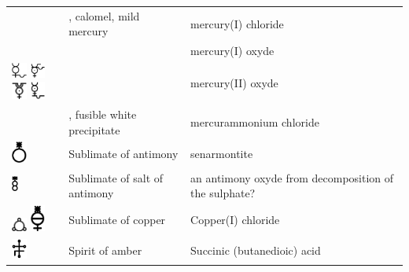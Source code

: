 \documentclass[british,final,landscape]{scrartcl}
\begin{document}
\begin{refsection}
\begin{supertabular}{p{0.3\textwidth}p{0.34\textwidth}p{0.34\textwidth}}
   & , calomel, mild mercury & mercury(I) chloride \\
   &  & mercury(I) oxyde  \\
   \includegraphics[width=5mm]{Compounds/HgO} \includegraphics[width=5mm]{Compounds/HgO2} \includegraphics[width=5mm]{Compounds/HgO3} \includegraphics[width=5mm]{Compounds/HgO4} &  & mercury(II) oxyde  \\
   & , fusible white precipitate & mercurammonium chloride  \\
   \includegraphics[width=5mm]{Compounds/SublimateOfAntimony} & Sublimate of antimony & senarmontite  \\
   \includegraphics[height=5mm]{Compounds/SublimateOfSaltOfAntimony} & Sublimate of salt of antimony & an antimony oxyde from decomposition of the sulphate? \\
   \includegraphics[width=5mm]{Compounds/SublimateOfCopper} \includegraphics[width=5mm]{Compounds/SublimateOfCopper2} & Sublimate of copper & Copper(I) chloride  \\
   \includegraphics[width=5mm]{Compounds/SuccinicAcid} & Spirit of amber & Succinic (butanedioic) acid  \\

\end{supertabular}
\end{refsection}
\end{document}
